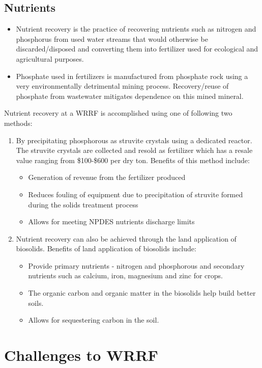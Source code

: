 \subsection{Nutrients}
\begin{itemize}
\item Nutrient recovery is the practice of recovering nutrients such as nitrogen and phosphorus from used water streams that would otherwise be discarded/disposed and converting them into fertilizer used for ecological and agricultural purposes. 
\item Phosphate used in fertilizers is manufactured from phosphate rock using a very environmentally detrimental mining process.  Recovery/reuse of phosphate from wastewater mitigates dependence on this mined mineral.
\end{itemize} 
Nutrient recovery at a WRRF is accomplished using one of following two methods:
\begin{enumerate}[1.] 
\item By precipitating phosphorous as struvite crystals using a dedicated reactor. The struvite crystals are collected and resold as fertilizer which has a resale value ranging from \$100-\$600 per dry ton.  Benefits of this method include:
\begin{itemize}
\item Generation of revenue from the fertilizer produced
\item Reduces fouling of equipment due to precipitation of struvite formed during the solids treatment process
\item Allows for meeting NPDES nutrients discharge limits
\end{itemize}
\item Nutrient recovery can also be achieved through the land application of biosolids. Benefits of land application of biosolids include:
\begin{itemize}
\item Provide primary nutrients - nitrogen and phosphorous and secondary nutrients such as calcium, iron, magnesium and zinc for crops.
\item The organic carbon and organic matter in the biosolids help build better soils. 
\item Allows for sequestering carbon in the soil.
\end{itemize}
\end{enumerate}


\section{Challenges to WRRF}

